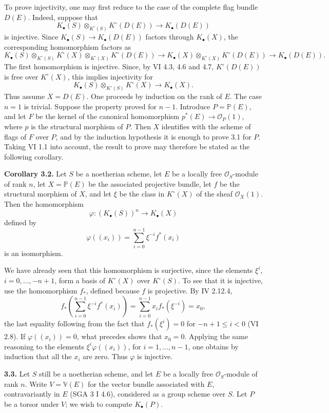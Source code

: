 To prove injectivity, one may first reduce to the case of the complete flag bundle $D(E)$. Indeed, suppose that
\[
 K_\bullet(S)\otimes_{K^\circ(S)}K^\circ(D(E))\longrightarrow K_\bullet(D(E))
\]
is injective. Since $K_\bullet(S)\to K_\bullet(D(E))$ factors through $K_\bullet(X)$, the corresponding homomorphism factors as
\[
 K_\bullet(S)\otimes_{K^\circ(S)}K^\circ(X)\otimes_{K^\circ(X)}K^\circ(D(E))
 \longrightarrow
 K_\bullet(X)\otimes_{K^\circ(X)}K^\circ(D(E))
 \longrightarrow K_\bullet(D(E)).
\]
The first homomorphism is injective. Since, by VI 4.3, 4.6 and 4.7, $K^\circ(D(E))$ is free over $K^\circ(X)$, this implies injectivity for
\[
 K_\bullet(S)\otimes_{K^\circ(S)}K^\circ(X)\to K_\bullet(X).
\]
Thus assume $X=D(E)$. One proceeds by induction on the rank of $E$. The case $n=1$ is trivial. Suppose the property proved for $n-1$. Introduce $P=\mathbb P(E)$, and let $F$ be the kernel of the canonical homomorphism $p^*(E)\to\mathcal O_P(1)$, where $p$ is the structural morphism of $P$. Then $X$ identifies with the scheme of flags of $F$ over $P$, and by the induction hypothesis it is enough to prove 3.1 for $P$. Taking VI 1.1 into account, the result to prove may therefore be stated as the following corollary.

\textbf{Corollary 3.2.} Let $S$ be a noetherian scheme, let $E$ be a locally free $\mathcal O_S$-module of rank $n$, let $X=\mathbb P(E)$ be the associated projective bundle, let $f$ be the structural morphism of $X$, and let $\xi$ be the class in $K^\circ(X)$ of the sheaf $\mathcal O_X(1)$. Then the homomorphism
\[
 \varphi:(K_\bullet(S))^n\longrightarrow K_\bullet(X)
\]
defined by
\[
 \varphi((x_i))=\sum_{i=0}^{n-1}\xi^{-i}f^*(x_i)
\]
is an isomorphism.

We have already seen that this homomorphism is surjective, since the elements $\xi^i$, $i=0,\ldots,-n+1$, form a basis of $K^\circ(X)$ over $K^\circ(S)$. To see that it is injective, use the homomorphism $f_*$, defined because $f$ is projective. By IV 2.12.4,
\[
 f_*\left(\sum_{i=0}^{n-1}\xi^{-i}f^*(x_i)\right)
 =\sum_{i=0}^{n-1}x_i f_*(\xi^{-i})=x_0,
\]
the last equality following from the fact that $f_*(\xi^i)=0$ for $-n+1\leq i<0$ (VI 2.8). If $\varphi((x_i))=0$, what precedes shows that $x_0=0$. Applying the same reasoning to the elements $\xi^i\varphi((x_i))$, for $i=1,\ldots,n-1$, one obtains by induction that all the $x_i$ are zero. Thus $\varphi$ is injective.

\textbf{3.3.} Let $S$ still be a noetherian scheme, and let $E$ be a locally free $\mathcal O_S$-module of rank $n$. Write $V=\mathbb V(E)$ for the vector bundle associated with $E$, contravariantly in $E$ (SGA 3 I 4.6), considered as a group scheme over $S$. Let $P$ be a torsor under $V$; we wish to compute $K_\bullet(P)$.

